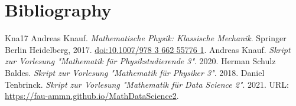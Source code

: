 \chapter{Bibliography}
\label{\detokenize{references:bibliography}}\label{\detokenize{references::doc}}


\begin{sphinxthebibliography}{Kna17}
Andreas Knauf. \emph{Mathematische Physik: Klassische Mechanik}. Springer Berlin Heidelberg, 2017. \href{https://doi.org/10.1007/978-3-662-55776-1}{doi:10.1007/978 3 662 55776 1}.
Andreas Knauf. \emph{Skript zur Vorlesung "Mathematik für Physikstudierende 3"}. 2020.
Herman Schulz Baldes. \emph{Skript zur Vorlesung "Mathematik für Physiker 3"}. 2018.
Daniel Tenbrinck. \emph{Skript zur Vorlesung "Mathematik für Data Science 2"}. 2021. URL: \url{https://fau-ammn.github.io/MathDataScience2}.
\end{sphinxthebibliography}






\renewcommand{\indexname}{Proof Index}


\renewcommand{\indexname}{Index}

